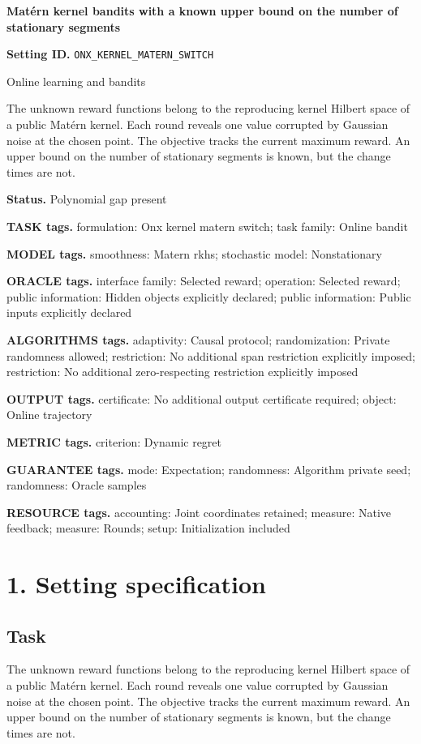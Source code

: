 \documentclass[10pt,a4paper]{article}
\begin{document}
\raggedright

{\LARGE\bfseries\sffamily\color{AtlasNavy} Matérn kernel bandits with a known upper bound on the number of stationary segments\par}\vspace{5pt}
\textbf{Setting ID.} \texttt{ONX\_\allowbreak{}KERNEL\_\allowbreak{}MATERN\_\allowbreak{}SWITCH}

Online learning and bandits

The unknown reward functions belong to the reproducing kernel Hilbert space of a public Matérn kernel. Each round reveals one value corrupted by Gaussian noise at the chosen point. The objective tracks the current maximum reward. An upper bound on the number of stationary segments is known, but the change times are not.

\textbf{Status.} Polynomial gap present

\textbf{TASK tags.} formulation: Onx kernel matern switch; task family: Online bandit

\textbf{MODEL tags.} smoothness: Matern rkhs; stochastic model: Nonstationary

\textbf{ORACLE tags.} interface family: Selected reward; operation: Selected reward; public information: Hidden objects explicitly declared; public information: Public inputs explicitly declared

\textbf{ALGORITHMS tags.} adaptivity: Causal protocol; randomization: Private randomness allowed; restriction: No additional span restriction explicitly imposed; restriction: No additional zero-respecting restriction explicitly imposed

\textbf{OUTPUT tags.} certificate: No additional output certificate required; object: Online trajectory

\textbf{METRIC tags.} criterion: Dynamic regret

\textbf{GUARANTEE tags.} mode: Expectation; randomness: Algorithm private seed; randomness: Oracle samples

\textbf{RESOURCE tags.} accounting: Joint coordinates retained; measure: Native feedback; measure: Rounds; setup: Initialization included

\section{1. Setting specification}
\subsection{Task}
The unknown reward functions belong to the reproducing kernel Hilbert space of a public Matérn kernel. Each round reveals one value corrupted by Gaussian noise at the chosen point. The objective tracks the current maximum reward. An upper bound on the number of stationary segments is known, but the change times are not.
\end{document}
